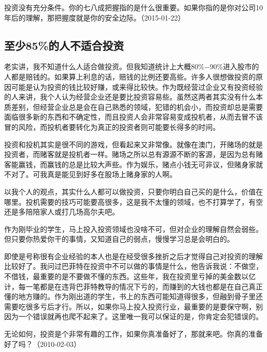 
投资没有充分条件。你的七八成把握指的是什么很重要。如果你指的是你对公司10年后的理解，那把握度就是你的安全边际。（2015-01-22）

\subsection{至少85\%的人不适合投资}


老实讲，我不知道什么人适合做投资。但我知道统计上大概80\%\( - \)90\%进入股市的人都是赔钱的。如果算上利息的话，赔钱的比例还要高些。许多人很想做投资的原因可能是认为投资的钱比较好赚，或来得比较快。作为既经营过企业又有投资经验的人来讲，我个人认为经营企业还是要比投资容易些。虽然这两者其实没有什么本质差别，但经营企业总是会在自己熟悉的领域，犯错的机会小，而投资却总是需要面临很多新的东西和不确定性，而且投资人会非常容易变成投机者，从而去冒不该冒的风险，而投机者要转化为真正的投资者则可能要长得多的时间。

投资和投机其实是很不同的游戏，但看起来又非常像。就像在澳门，开赌场的就是投资者，而赌客就是投机者一样。赌场之所以总有源源不断的客源，是因为总有赌客能赢钱，而赢钱的总是比较大声些。作为娱乐，赌点小钱无可非议，但赌身家就不对了。可我真是能见到好多在股场上赌身家的人啊。

以我个人的观点，其实什么人都可以做投资，只要你明白自己买的是什么，价值在哪里。投机需要的技巧可能要高很多，这是我不太懂的领域，也不打算学了，有空还是多陪陪家人或打几场高尔夫吧。

作为刚毕业的学生，马上投入投资领域也没啥不可，但对企业的理解自然会弱些。但只要你热爱你干的事情，又知道自己的弱点，慢慢学习总是会明白的。

即使是号称很有企业经验的本人也是在经受很多挫折之后才觉得自己对投资的理解比较好了。我问过巴菲特在投资中不可以做的事情是什么，他告诉我说：不做空，不借钱，最重要的是不要做不懂的东西。这些年，我在投资里亏掉的美金数以亿计，每一笔都是在违背巴菲特教导的情况下亏的，而赚到的大钱也都是在自己真正懂的地方赚的。作为刚出道的学生，书上的东西可能知道得很多，但融到骨子里还需要吃很多亏后才行。所以，如果你马上投入投资行业，最重要的是要保守啊，别因为一个错误就再也爬不起来了。这里唯一我可以保证的是，你肯定会犯错误的。

无论如何，投资是个非常有趣的工作，如果你真准备好了，那就来吧。你真的准备好了吗？（2010-02-03）



